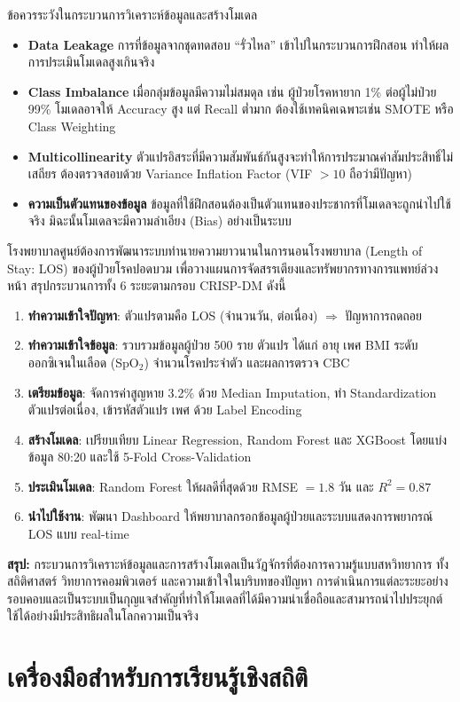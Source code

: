 \begin{myLimit}[]{ข้อควรระวังในกระบวนการวิเคราะห์ข้อมูลและสร้างโมเดล}{}
\begin{itemize}
    \item \textbf{Data Leakage} การที่ข้อมูลจากชุดทดสอบ ``รั่วไหล'' เข้าไปในกระบวนการฝึกสอน ทำให้ผลการประเมินโมเดลสูงเกินจริง
    \item \textbf{Class Imbalance} เมื่อกลุ่มข้อมูลมีความไม่สมดุล เช่น ผู้ป่วยโรคหายาก 1\% ต่อผู้ไม่ป่วย 99\% โมเดลอาจให้ Accuracy สูง แต่ Recall ต่ำมาก ต้องใช้เทคนิคเฉพาะเช่น SMOTE หรือ Class Weighting
    \item \textbf{Multicollinearity} ตัวแปรอิสระที่มีความสัมพันธ์กันสูงจะทำให้การประมาณค่าสัมประสิทธิ์ไม่เสถียร ต้องตรวจสอบด้วย Variance Inflation Factor (VIF $> 10$ ถือว่ามีปัญหา)
    \item \textbf{ความเป็นตัวแทนของข้อมูล} ข้อมูลที่ใช้ฝึกสอนต้องเป็นตัวแทนของประชากรที่โมเดลจะถูกนำไปใช้จริง มิฉะนั้นโมเดลจะมีความลำเอียง (Bias) อย่างเป็นระบบ
\end{itemize}
\end{myLimit}

\begin{exmp}
    โรงพยาบาลศูนย์ต้องการพัฒนาระบบทำนายความยาวนานในการนอนโรงพยาบาล (Length of Stay: LOS) ของผู้ป่วยโรคปอดบวม เพื่อวางแผนการจัดสรรเตียงและทรัพยากรทางการแพทย์ล่วงหน้า สรุปกระบวนการทั้ง 6 ระยะตามกรอบ CRISP-DM ดังนี้

    \begin{enumerate}
        \item \textbf{ทำความเข้าใจปัญหา}: ตัวแปรตามคือ LOS (จำนวนวัน, ต่อเนื่อง) $\Rightarrow$ ปัญหาการถดถอย
        \item \textbf{ทำความเข้าใจข้อมูล}: รวบรวมข้อมูลผู้ป่วย 500 ราย ตัวแปร ได้แก่ อายุ เพศ BMI ระดับออกซิเจนในเลือด (SpO$_2$) จำนวนโรคประจำตัว และผลการตรวจ CBC
        \item \textbf{เตรียมข้อมูล}: จัดการค่าสูญหาย 3.2\% ด้วย Median Imputation, ทำ Standardization ตัวแปรต่อเนื่อง, เข้ารหัสตัวแปร เพศ ด้วย Label Encoding
        \item \textbf{สร้างโมเดล}: เปรียบเทียบ Linear Regression, Random Forest และ XGBoost โดยแบ่งข้อมูล 80:20 และใช้ 5-Fold Cross-Validation
        \item \textbf{ประเมินโมเดล}: Random Forest ให้ผลดีที่สุดด้วย RMSE $= 1.8$ วัน และ $R^2 = 0.87$
        \item \textbf{นำไปใช้งาน}: พัฒนา Dashboard ให้พยาบาลกรอกข้อมูลผู้ป่วยและระบบแสดงการพยากรณ์ LOS แบบ real-time
    \end{enumerate}
\end{exmp}

\textbf{สรุป:} กระบวนการวิเคราะห์ข้อมูลและการสร้างโมเดลเป็นวัฏจักรที่ต้องการความรู้แบบสหวิทยาการ ทั้งสถิติศาสตร์ วิทยาการคอมพิวเตอร์ และความเข้าใจในบริบทของปัญหา การดำเนินการแต่ละระยะอย่างรอบคอบและเป็นระบบเป็นกุญแจสำคัญที่ทำให้โมเดลที่ได้มีความน่าเชื่อถือและสามารถนำไปประยุกต์ใช้ได้อย่างมีประสิทธิผลในโลกความเป็นจริง

\section{เครื่องมือสำหรับการเรียนรู้เชิงสถิติ}

\newpage
